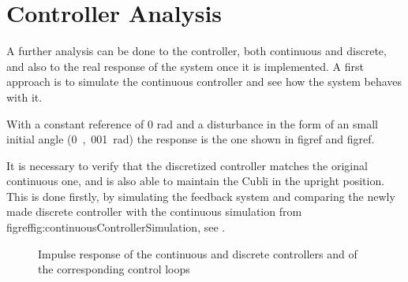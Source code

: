 \section{Controller Analysis}\label{ssec:ControllerVerification}
A further analysis can be done to the controller, both continuous and discrete, and also to the real response of the system once it is implemented.
A first approach is to simulate the continuous controller and see how the system behaves with it.

With a constant reference of 0 rad and a disturbance in the form of an small initial angle (\si{0,001 rad}) the response is the one shown in figref{} and figref{}.



It is necessary to verify that the discretized controller matches the original continuous one, and is also able to maintain the Cubli in the upright position. This is done firstly, by simulating the feedback system and comparing the newly made discrete controller with the continuous simulation from figref{fig:continuousControllerSimulation}, see .
%
\begin{figure}[H]
  \centering
  \caption{Impulse response of the continuous and discrete controllers and of the corresponding control loops}
  \label{fig:discreteVsContinuousSimulation}
\end{figure} 